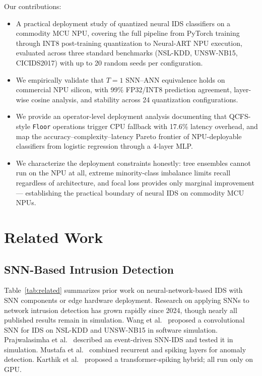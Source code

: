\documentclass[10pt,twocolumn]{article}
\begin{document}
Our contributions:
\begin{itemize}
  \item A practical deployment study of quantized neural IDS
    classifiers on a commodity MCU NPU, covering the full pipeline from
    PyTorch training through INT8 post-training quantization to
    Neural-ART NPU execution, evaluated across three standard
    benchmarks (NSL-KDD, UNSW-NB15, CICIDS2017) with up to 20 random
    seeds per configuration.
  \item We empirically validate that $T{=}1$ SNN--ANN equivalence holds
    on commercial NPU silicon, with 99\% FP32/INT8 prediction agreement,
    layer-wise cosine analysis, and stability across 24 quantization
    configurations.
  \item We provide an operator-level deployment analysis documenting
    that QCFS-style \texttt{Floor} operations trigger CPU fallback with
    17.6\% latency overhead, and map the accuracy--complexity--latency
    Pareto frontier of NPU-deployable classifiers from logistic
    regression through a 4-layer MLP.
  \item We characterize the deployment constraints honestly: tree
    ensembles cannot run on the NPU at all, extreme minority-class
    imbalance limits recall regardless of architecture, and focal loss
    provides only marginal improvement --- establishing the practical
    boundary of neural IDS on commodity MCU NPUs.
\end{itemize}

\section{Related Work}
\label{sec:related}

\subsection{SNN-Based Intrusion Detection}

Table~\ref{tab:related} summarizes prior work on neural-network-based IDS
with SNN components or edge hardware deployment.
Research on applying SNNs to network intrusion detection has grown rapidly
since 2024, though nearly all published results remain in simulation.
Wang et al.~\cite{nature2024csnn} proposed a convolutional SNN for IDS
on NSL-KDD and UNSW-NB15 in software simulation.
Prajwalasimha et al.~\cite{ieee2025event} described an event-driven
SNN-IDS and tested it in simulation.
Mustafa et al.~\cite{pmc2025hybrid} combined recurrent and spiking layers
for anomaly detection.
Karthik et al.~\cite{nature2026transformer} proposed a
transformer-spiking hybrid; all run only on GPU.
\end{document}
